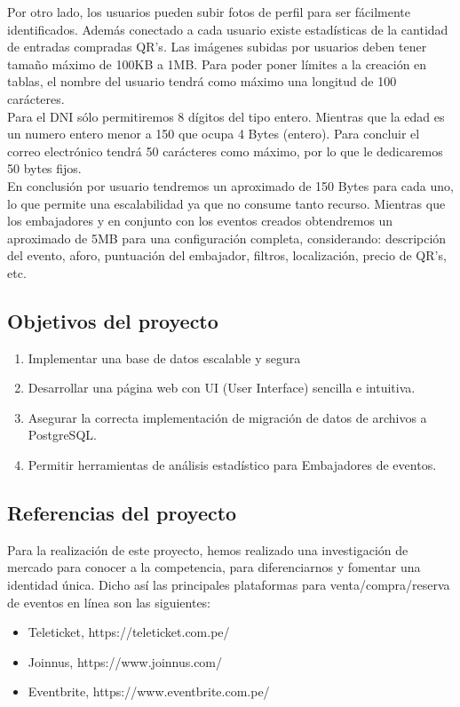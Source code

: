 Por otro lado, los usuarios pueden subir fotos de perfil para ser fácilmente identificados. Además conectado a cada usuario existe estadísticas de la cantidad de entradas compradas QR's. Las imágenes subidas por usuarios deben tener tamaño máximo de 100KB a 1MB. Para poder poner límites a la creación en tablas, el nombre del usuario tendrá como máximo una longitud de 100 carácteres.\\

Para el DNI sólo permitiremos 8 dígitos del tipo entero. Mientras que la edad es un numero entero menor a 150 que ocupa 4 Bytes (entero). Para concluir el correo electrónico tendrá 50 carácteres como máximo, por lo que le dedicaremos 50 bytes fijos.\\

En conclusión por usuario tendremos un aproximado de 150 Bytes para cada uno, lo que permite una escalabilidad ya que no consume tanto recurso. Mientras que los embajadores y en conjunto con los eventos creados obtendremos un aproximado de 5MB para una configuración completa, considerando: descripción del evento, aforo, puntuación del embajador, filtros, localización, precio de QR's, etc.\\

\subsection{Objetivos del proyecto}
\begin{enumerate}
    \item Implementar una base de datos escalable y segura
    \item Desarrollar una página web con UI (User Interface) sencilla e intuitiva.
    \item Asegurar la correcta implementación de migración de datos de archivos  a PostgreSQL.
    \item Permitir herramientas de análisis estadístico para Embajadores de eventos.\\
\end{enumerate}

\subsection{Referencias del proyecto}
Para la realización de este proyecto, hemos realizado una investigación de mercado para conocer a la competencia, para diferenciarnos y fomentar una identidad única. Dicho así las principales plataformas para venta/compra/reserva de eventos en línea son las siguientes:
\begin{itemize}
    \item Teleticket, https://teleticket.com.pe/
    \item Joinnus, https://www.joinnus.com/
    \item Eventbrite, https://www.eventbrite.com.pe/
\end{itemize}


